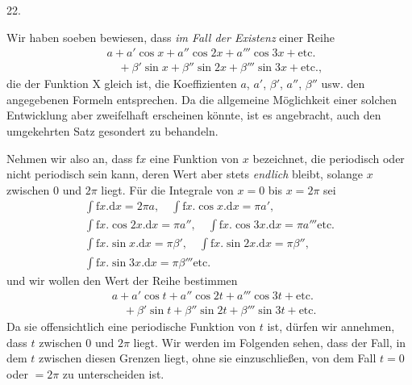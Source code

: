 \par{}\bigskip
{}
\begin{center}22.\end{center}
\begingroup
\makeatletter\tagsleft@true\let\veqno\@@leqno\makeatother
\setlength{\lineskip}{4pt}\setlength{\lineskiplimit}{4pt}
\noindent\hspace*{\parindent}Wir haben soeben bewiesen, dass \textit{im Fall der Existenz} einer Reihe
\[
\begin{aligned}
&a+a'\cos x+a''\cos2x+a'''\cos3x+\text{etc.}\\
&\quad{}+\beta'\sin x+\beta''\sin2x+\beta'''\sin3x+\text{etc.,}
\end{aligned}
\]
\noindent die der Funktion \(\mathrm{X}\) gleich ist, die Koeffizienten \(a\), \(a'\), \(\beta'\), \(a''\), \(\beta''\) usw. den angegebenen Formeln entsprechen. Da die allgemeine Möglichkeit einer solchen Entwicklung aber zweifelhaft erscheinen könnte, ist es angebracht, auch den umgekehrten Satz gesondert zu behandeln.
\par
Nehmen wir also an, dass \(\mathrm{f}x\) eine Funktion von \(x\) bezeichnet, die periodisch oder nicht periodisch sein kann, deren Wert aber stets \textit{endlich} bleibt, solange \(x\) zwischen \(0\) und \(2\pi\) liegt. Für die Integrale von \(x=0\) bis \(x=2\pi\) sei
\[
\begin{gathered}
\int\mathrm{f}x.\mathrm{d}x=2\pi a,\quad\int\mathrm{f}x.\cos x.\mathrm{d}x=\pi a',\\[3pt]
\int\mathrm{f}x.\cos2x.\mathrm{d}x=\pi a'',\quad\int\mathrm{f}x.\cos3x.\mathrm{d}x=\pi a'''\text{etc.}\\[3pt]
\int\mathrm{f}x.\sin x.\mathrm{d}x=\pi\beta',\quad\int\mathrm{f}x.\sin2x.\mathrm{d}x=\pi\beta'',\\[3pt]
\int\mathrm{f}x.\sin3x.\mathrm{d}x=\pi\beta'''\text{etc.}
\end{gathered}
\]
\noindent und wir wollen den Wert der Reihe bestimmen
\[
\tag*{(T)}\begin{aligned}
&a+a'\cos t+a''\cos2t+a'''\cos3t+\text{etc.}\\
&\quad{}+\beta'\sin t+\beta''\sin2t+\beta'''\sin3t+\text{etc.}
\end{aligned}
\]
\noindent Da sie offensichtlich eine periodische Funktion von \(t\) ist, dürfen wir annehmen, dass \(t\) zwischen \(0\) und \(2\pi\) liegt. Wir werden im Folgenden sehen, dass der Fall, in dem \(t\) zwischen diesen Grenzen liegt, ohne sie einzuschließen, von dem Fall \(t=0\) oder \(=2\pi\) zu unterscheiden ist.
